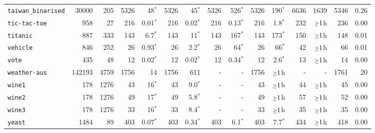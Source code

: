 \begin{tabular}{lccrrrrrrrrrrrr}
\texttt{taiwan\_binarised} & \multicolumn{1}{r}{30000} & \multicolumn{1}{r}{205}  & 5326 & 48$^*$ & 5326 & 45$^*$ & 5326 & 526$^*$ & 5326 & 190$^*$ & 6636 & 1639 & 5346 & 0.26\\
\texttt{tic-tac-toe} & \multicolumn{1}{r}{958} & \multicolumn{1}{r}{27}  & 216 & 0.01$^*$ & 216 & 0.02$^*$ & 216 & 0.13$^*$ & 216 & 1.8$^*$ & 232 & $\mathsmaller{\geq}1$h & 236 & 0.00\\
\texttt{titanic} & \multicolumn{1}{r}{887} & \multicolumn{1}{r}{333}  & 143 & 6.7$^*$ & 143 & 11$^*$ & 143 & 167$^*$ & 143 & 173$^*$ & 150 & $\mathsmaller{\geq}1$h & 148 & 0.01\\
\texttt{vehicle} & \multicolumn{1}{r}{846} & \multicolumn{1}{r}{252}  & 26 & 0.93$^*$ & 26 & 2.2$^*$ & 26 & 64$^*$ & 26 & 66$^*$ & 42 & $\mathsmaller{\geq}1$h & 66 & 0.01\\
\texttt{vote} & \multicolumn{1}{r}{435} & \multicolumn{1}{r}{48}  & 12 & 0.02$^*$ & 12 & 0.02$^*$ & 12 & 0.34$^*$ & 12 & 2.6$^*$ & 13 & $\mathsmaller{\geq}1$h & 14 & 0.00\\
\texttt{weather-aus} & \multicolumn{1}{r}{142193} & \multicolumn{1}{r}{4759}  & 1756 & 14 & 1756 & 611 & - & - & 1756 & $\mathsmaller{\geq}1$h & - & - & 1761 & 20\\
\texttt{wine1} & \multicolumn{1}{r}{178} & \multicolumn{1}{r}{1276}  & 43 & 16$^*$ & 43 & 9.0$^*$ & - & - & 43 & $\mathsmaller{\geq}1$h & 44 & $\mathsmaller{\geq}1$h & 45 & 0.00\\
\texttt{wine2} & \multicolumn{1}{r}{178} & \multicolumn{1}{r}{1276}  & 49 & 17$^*$ & 49 & 5.8$^*$ & - & - & 49 & $\mathsmaller{\geq}1$h & 57 & $\mathsmaller{\geq}1$h & 52 & 0.00\\
\texttt{wine3} & \multicolumn{1}{r}{178} & \multicolumn{1}{r}{1276}  & 33 & 16$^*$ & 33 & 8.4$^*$ & - & - & 33 & $\mathsmaller{\geq}1$h & 35 & $\mathsmaller{\geq}1$h & 35 & 0.00\\
\texttt{yeast} & \multicolumn{1}{r}{1484} & \multicolumn{1}{r}{89}  & 403 & 0.07$^*$ & 403 & 0.34$^*$ & 403 & 6.1$^*$ & 403 & 7.7$^*$ & 434 & $\mathsmaller{\geq}1$h & 418 & 0.00\\
\bottomrule
\end{tabular}
